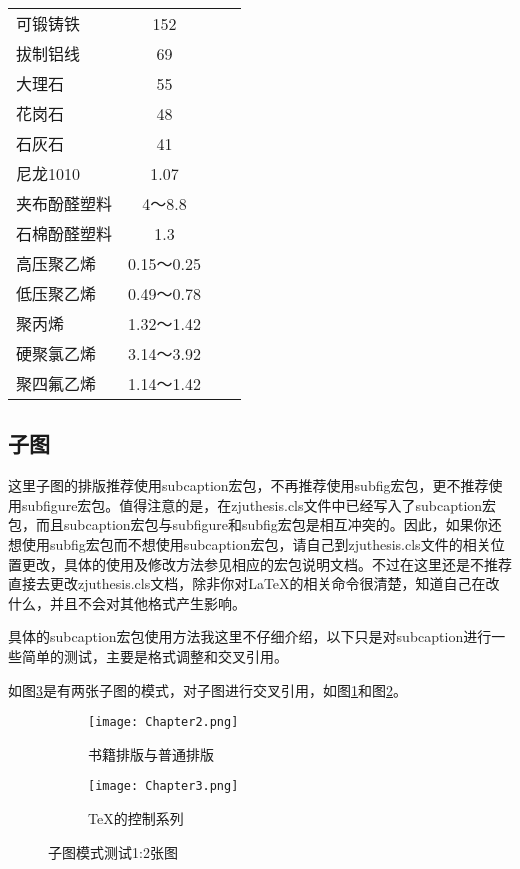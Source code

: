 \begin{longtabu}{lccc}
可锻铸铁   & 152    &        &  \\
拔制铝线   & 69     &        &  \\
大理石    & 55     &        &  \\
花岗石    & 48     &        &  \\
石灰石    & 41     &        &  \\
尼龙1010 & 1.07   &        &  \\
夹布酚醛塑料 &  4～8.8 &        &  \\
石棉酚醛塑料 & 1.3    &        &  \\
高压聚乙烯  &  0.15～0.25 &        &  \\
低压聚乙烯  &  0.49～0.78 &        &  \\
聚丙烯    &  1.32～1.42 &        &  \\
硬聚氯乙烯  &  3.14～3.92 &        &  \\
聚四氟乙烯  &  1.14～1.42 &        &  \\
\end{longtabu}%

\subsection{子图}
这里子图的排版推荐使用subcaption宏包，不再推荐使用subfig宏包，更不推荐使用subfigure宏包。值得注意的是，在zjuthesis.cls文件中已经写入了subcaption宏包，而且subcaption宏包与subfigure和subfig宏包是相互冲突的。因此，如果你还想使用subfig宏包而不想使用subcaption宏包，请自己到zjuthesis.cls文件的相关位置更改，具体的使用及修改方法参见相应的宏包说明文档。不过在这里还是不推荐直接去更改zjuthesis.cls文档，除非你对\LaTeX 的相关命令很清楚，知道自己在改什么，并且不会对其他格式产生影响。

具体的subcaption宏包使用方法我这里不仔细介绍，以下只是对subcaption进行一些简单的测试，主要是格式调整和交叉引用。

如图\ref{fig:subfig_test1}是有两张子图的模式，对子图进行交叉引用，如图\ref{subfig:1a}和图\ref{subfig:1b}。

\begin{figure}[htbp]
	\centering
	\begin{subfigure}[b]{.4\textwidth}
		\centering
		\texttt{[image: Chapter2.png]}
		\caption{书籍排版与普通排版}\label{subfig:1a}
	\end{subfigure}
	\quad
	\begin{subfigure}[b]{.4\textwidth}
		\centering
		\texttt{[image: Chapter3.png]}
		\caption{\TeX 的控制系列}\label{subfig:1b}
	\end{subfigure}
	\caption{子图模式测试1:2张图}\label{fig:subfig_test1}
\end{figure}


